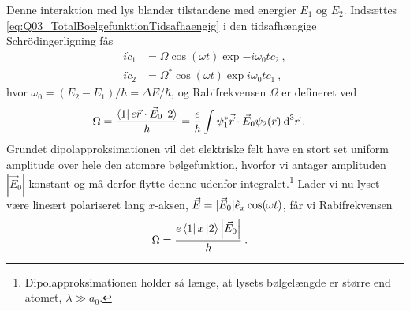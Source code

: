 Denne interaktion med lys blander tilstandene med energier $E_1$ og $E_2$. Indsættes \cref{eq:Q03_TotalBoelgefunktionTidsafhaengig} i den tidsafhængige Schrödingerligning fås
\begin{align}
    i\Dot{c}_1 &= \Omega \cos(\omega t) \exp{-i\omega_0 t} c_2 \: , \label{eq:Q03_CoupledDifferentialEquationsForC1AndC2_C1} \\
    i\Dot{c}_2 &= \Omega^* \cos(\omega t) \exp{i\omega_0 t} c_1 \: , \label{eq:Q03_CoupledDifferentialEquationsForC1AndC2_C2}
\end{align}
hvor $\omega_0 = (E_2 - E_1)/\hbar = \Delta E / \hbar$, og \textsf{Rabifrekvensen} $\Omega$ er defineret ved
\begin{align}
    \Omega &= \frac{\bra{1}e\Vec{r}\cdot\Vec{E}_0\ket{2}}{\hbar} = \frac{e}{\hbar} \int \psi_1^* \Vec{\Vec{r}} \cdot \Vec{E}_0 \psi_2(\Vec{r}) \: \text{d}^3\Vec{r} \: .
\end{align}
Grundet \textsf{dipolapproksimationen} vil det elektriske felt have en stort set uniform amplitude over hele den atomare bølgefunktion, hvorfor vi antager amplituden $|\Vec{E}_0|$ konstant og må derfor flytte denne udenfor integralet.\footnote{Dipolapproksimationen holder så længe, at lysets bølgelængde er større end atomet, $\lambda \gg a_0$.} Lader vi nu lyset være lineært polariseret lang $x$-aksen, $\Vec{E} = |\Vec{E}_0|\Hat{e}_x\cos(\omega t)$, får vi Rabifrekvensen
\begin{align}
    \Omega &= \frac{e\bra{1}x\ket{2}\abs{\Vec{E}_0}}{\hbar} \: .
\end{align}


